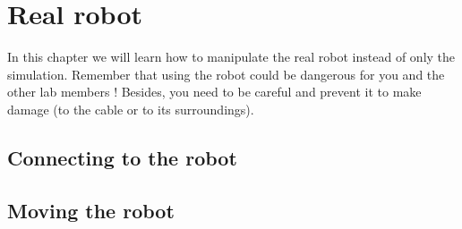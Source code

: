 \chapter{Real robot}

In this chapter we will learn how to manipulate the real robot instead of only the simulation. Remember that using the robot could be dangerous for you and the other lab members ! Besides, you need to be careful and prevent it to make damage (to the cable or to its surroundings).

\section{Connecting to the robot}

\section{Moving the robot}